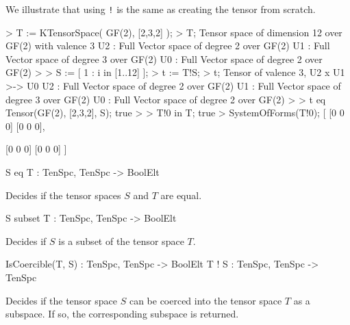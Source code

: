 \begin{example}[Coercion]
We illustrate that using \texttt{!} is the same as creating the tensor from scratch.

\begin{code}
> T := KTensorSpace( GF(2), [2,3,2] );
> T;
Tensor space of dimension 12 over GF(2) with valence 3
U2 : Full Vector space of degree 2 over GF(2)
U1 : Full Vector space of degree 3 over GF(2)
U0 : Full Vector space of degree 2 over GF(2)
> 
> S := [ 1 : i in [1..12] ];
> t := T!S;
> t;
Tensor of valence 3, U2 x U1 >-> U0
U2 : Full Vector space of degree 2 over GF(2)
U1 : Full Vector space of degree 3 over GF(2)
U0 : Full Vector space of degree 2 over GF(2)
> 
> t eq Tensor(GF(2), [2,3,2], S);
true
> 
> T!0 in T;
true
> SystemOfForms(T!0);
[
    [0 0 0]
    [0 0 0],

    [0 0 0]
    [0 0 0]
]
\end{code}

\end{example}

\begin{intrinsics}
S eq T : TenSpc, TenSpc -> BoolElt
\end{intrinsics}

Decides if the tensor spaces $S$ and $T$ are equal.

\begin{intrinsics}
S subset T : TenSpc, TenSpc -> BoolElt
\end{intrinsics}

Decides if $S$ is a subset of the tensor space $T$.

\begin{intrinsics}
IsCoercible(T, S) : TenSpc, TenSpc -> BoolElt
T ! S : TenSpc, TenSpc -> TenSpc
\end{intrinsics}

Decides if the tensor space $S$ can be coerced into the tensor space $T$ as a subspace. If so, the corresponding subspace is returned. 

